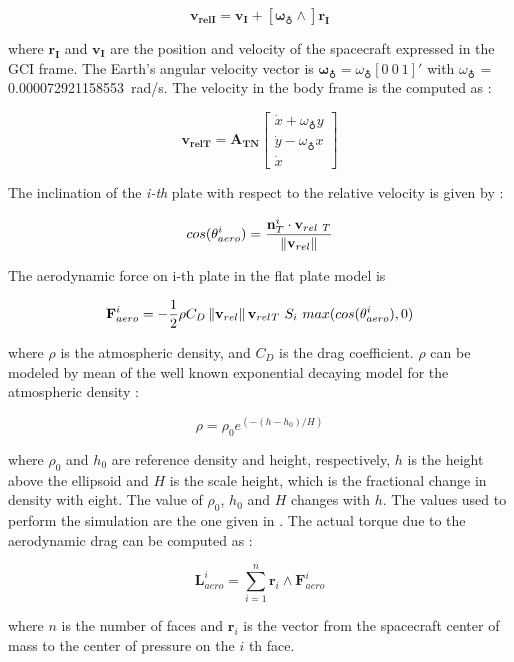 \begin{equation}
  \mathbf{v_{relI}} =  \mathbf{v_I} + [\mathbf{\omega_{\earth} \wedge}] \mathbf{r_I}
\end{equation}

where $\mathbf{r_I}$ and $\mathbf{v_I}$ are the position and velocity of the spacecraft expressed in the GCI frame.
The Earth's angular velocity vector is $\mathbf{\omega_{\earth}} = \omega_{\earth}[0 \ 0 \ 1]'$ with $\omega_{\earth}$ = \SI{0.000072921158553}{\radian/\second}.
The velocity in the body frame is the computed as :

\begin{equation}
  \mathbf{v_{relT}} = \mathbf{A_{TN}}   \begin{bmatrix} \dot{x} + \omega_{\earth} y \\ \dot{y} - \omega_{\earth} x \\ \dot{x} \end{bmatrix}
\end{equation}

The inclination of the \textit{i-th} plate with respect to the relative velocity is given by :

\begin{equation}
  cos(\theta_{aero}^{i}) = \frac{\mathbf{n}_{T}^{i} \cdot \mathbf{v}_{rel\ T}}{\norm{\mathbf{v}_{rel}}}
\end{equation}

The aerodynamic force on i-th plate in the flat plate model is

\begin{equation}
  \mathbf{F}_{aero}^{i} = - \frac{1}{2} \rho C_{D} \norm{\mathbf{v}_{rel}} \mathbf{v}_{rel_{} T}\ S_{i}\ max(cos(\theta_{aero}^{i}),0)
\end{equation}

where $\rho$ is the atmospheric density, and $C_D$ is the drag coefficient.
$\rho$ can be modeled by mean of the well known exponential decaying model for the atmospheric density :

\begin{equation}
  \rho = \rho_{0} e^{(-(h-h_{0})/H)}
\end{equation}

where $\rho_{0}$ and $h_{0}$ are reference density and height, respectively, $h$ is the height above the ellipsoid and $H$ is the scale height, which is the fractional change in density with eight.
The value of $\rho_{0}$, $h_{0}$  and $H$ changes with $h$.
The values used to perform the simulation are the one given in \cite{Markley2014}.
The actual torque due to the aerodynamic drag can be computed as :

\begin{equation}
  \mathbf{L}_{aero}^{i} = \sum\limits_{i=1}^n  \mathbf{r}_{i} \wedge \mathbf{F}_{aero}^{i}
\end{equation}

where $n$ is the number of faces and $\mathbf{r}_{i}$ is the vector from the spacecraft center of mass to the center of pressure on the $i$ th face.